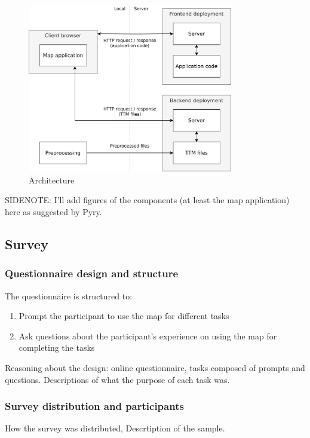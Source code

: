 \begin{figure}[H]
	\centering
	\includegraphics[width=0.8\textwidth]{visual/figures/diagrams/architechture.png}
	\caption{Architecture}
	\label{fig:architechture}
\end{figure}

SIDENOTE: I'll add figures of the components (at least the map application) here as suggested by Pyry.






\subsection{Survey}

\subsubsection{Questionnaire design and structure}

The questionnaire is structured to:
\begin{enumerate}
	\item Prompt the participant to use the map for different tasks
	\item Ask questions about the participant's experience
	on using the map for completing the tasks
\end{enumerate}

Reasoning about the design: online questionnaire, tasks composed of prompts and questions.
Descriptions of what the purpose of each task was.

\subsubsection{Survey distribution and participants}
How the survey was distributed,
Descrtiption of the sample.
